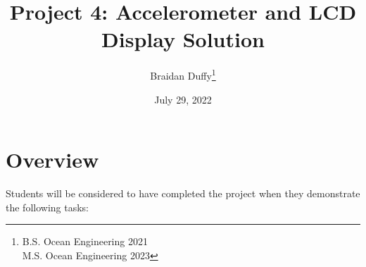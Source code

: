 \documentclass{article}
\title{Project 4: Accelerometer and LCD Display Solution}
\author{Braidan Duffy\thanks{B.S. Ocean Engineering 2021\\M.S. Ocean Engineering 2023}}
\date{July 29, 2022}
\begin{document}
\maketitle

\section*{Overview}
Students will be considered to have completed the project when they demonstrate the following tasks:
\end{document}
